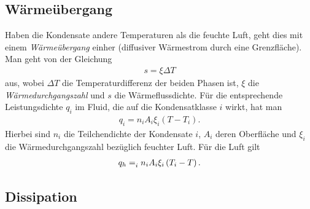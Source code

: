 \documentclass{book}
\let\sum\relax
\DeclareMathOperator*{\sum}{\raisebox{-3.5pt}{\scalebox{2}{\rotatebox{1}{{\bask Σ}}}}}
\begin{document}
\subsection{Wärmeübergang}
\label{sec:waermeuebergang}

Haben die Kondensate andere Temperaturen als die feuchte Luft, geht dies mit einem \textit{Wärmeübergang} einher (diffusiver Wärmestrom durch eine Grenzfläche). Man geht von der Gleichung
%
\begin{eqnarray}
s = \xi\Delta T
\end{eqnarray}
%
aus, wobei $\Delta T$ die Temperaturdifferenz der beiden Phasen ist, $\xi$ die \textit{Wärmedurchgangszahl} und $s$ die Wärmeflussdichte. Für die entsprechende Leistungsdichte $q_i$ im Fluid, die auf die Kondensatklasse $i$ wirkt, hat man
%
\begin{eqnarray}
q_i = n_iA_i\xi_i\left(T - T_i\right).
\end{eqnarray}
%
Hierbei sind $n_i$ die Teilchendichte der Kondensate $i$, $A_i$ deren Oberfläche und $\xi_i$ die Wärmedurchgangszahl bezüglich feuchter Luft. Für die Luft gilt
%
\begin{eqnarray}
q_h = \sum_{i}^{}n_iA_i\xi_i\left(T_i - T\right).
\end{eqnarray}
%
\subsection{Dissipation}
\label{sec:dissipation}
\end{document}
